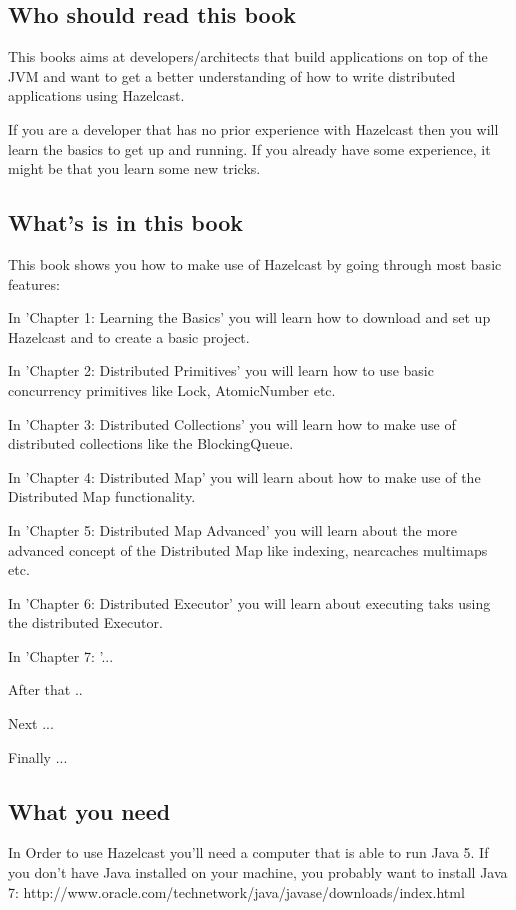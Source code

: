 \subsection*{Who should read this book}
This books aims at developers/architects that build applications on top of the JVM and want to get a better understanding of how to write distributed applications using Hazelcast.

If you are a developer that has no prior experience with Hazelcast then you will learn the basics to get up and running. If you already have some experience, it might be that you learn some new tricks.

\subsection*{What's is in this book}

This book shows you how to make use of Hazelcast by going through most basic features:

In 'Chapter 1: Learning the Basics' you will learn how to download and set up Hazelcast and to create a basic project.

In 'Chapter 2: Distributed Primitives' you will learn how to use basic concurrency primitives like Lock, AtomicNumber etc.

In 'Chapter 3: Distributed Collections' you will learn how to make use of distributed collections like the BlockingQueue.

In 'Chapter 4: Distributed Map' you will learn about how to make use of the Distributed Map functionality.

In 'Chapter 5: Distributed Map Advanced' you will learn about the more advanced concept of the Distributed Map like indexing, nearcaches
multimaps etc.

In 'Chapter 6: Distributed Executor' you will learn about executing taks using the distributed Executor.

In 'Chapter 7: '...

After that ..

Next ...

Finally ...

\subsection*{What you need}
In Order to use Hazelcast you'll need a computer that is able to run Java 5. If you don't have Java installed on your machine, you probably want to install Java 7: 
http://www.oracle.com/technetwork/java/javase/downloads/index.html

